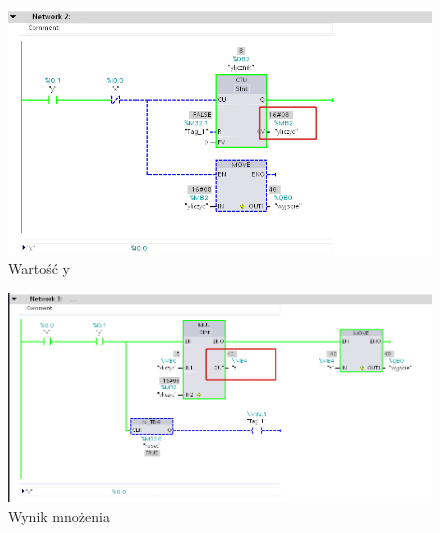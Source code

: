\documentclass[12pt]{article}
\begin{document}
\begin{figure}[H]
    \centering
    \includegraphics[width=\textwidth]{./zdj/mnozenie_test2.png}
    \caption{Wartość y}
    \label{mnozenie_test2}
\end{figure} 

\begin{figure}[H]
    \centering
    \includegraphics[width=\textwidth]{./zdj/mnozenie_test3.png}
    \caption{Wynik mnożenia}
    \label{mnozenie_test3}
\end{figure} 
\end{document}
